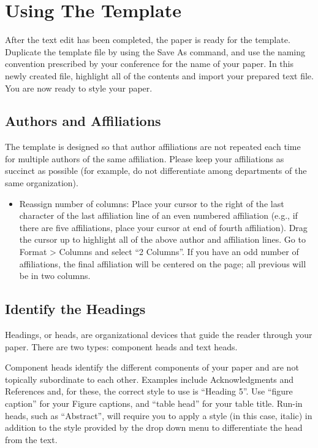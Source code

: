 \documentclass[conference]{IEEEconf}
\begin{document}
\section{Using The Template}
After the text edit has been completed, the paper is ready for the template. Duplicate the template file by using the Save As command, and use the naming convention prescribed by your conference for the name of your paper. In this newly created file, highlight all of the contents and import your prepared text file. You are now ready to style your paper. 

\subsection{Authors and Affiliations}

The template is designed so that author affiliations are not repeated each time for multiple authors of the same affiliation. Please keep your affiliations as succinct as possible (for example, do not differentiate among departments of the same organization).

\begin{itemize}
\item Reassign number of columns: Place your cursor to the right of the last character of the last affiliation line of an even numbered affiliation (e.g., if there are five affiliations, place your cursor at end of fourth affiliation). Drag the cursor up to highlight all of the above author and affiliation lines. Go to Format >  Columns and select “2 Columns”. If you have an odd number of affiliations, the final affiliation will be centered on the page; all previous will be in two columns.
\end{itemize}

\subsection{Identify the Headings}
Headings, or heads, are organizational devices that guide the reader through your paper. There are two types: component heads and text heads.

Component heads identify the different components of your paper and are not topically subordinate to each other. Examples include Acknowledgments and References and, for these, the correct style to use is “Heading 5”. Use “figure caption” for your Figure captions, and “table head” for your table title. Run-in heads, such as “Abstract”, will require you to apply a style (in this case, italic) in addition to the style provided by the drop down menu to differentiate the head from the text.
\end{document}
